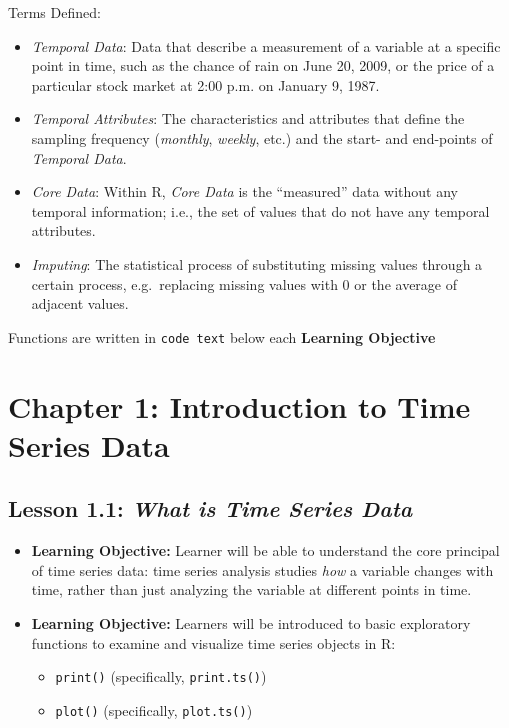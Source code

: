 \documentclass[
]{book}
\providecommand{\tightlist}{%
  \setlength{\itemsep}{0pt}\setlength{\parskip}{0pt}}
\begin{document}
Terms Defined:

\begin{itemize}
\tightlist
\item
  \emph{Temporal Data}: Data that describe a measurement of a variable at a specific point in time, such as the chance of rain on June 20, 2009, or the price of a particular stock market at 2:00 p.m. on January 9, 1987.
\item
  \emph{Temporal Attributes}: The characteristics and attributes that define the sampling frequency (\emph{monthly}, \emph{weekly}, etc.) and the start- and end-points of \emph{Temporal Data}.
\item
  \emph{Core Data}: Within R, \emph{Core Data} is the ``measured'' data without any temporal information; i.e., the set of values that do not have any temporal attributes.
\item
  \emph{Imputing}: The statistical process of substituting missing values through a certain process, e.g.~replacing missing values with 0 or the average of adjacent values.
\end{itemize}

Functions are written in \texttt{code\ text} below each \textbf{Learning Objective}

\hypertarget{chapter-1-introduction-to-time-series-data}{%
\section*{Chapter 1: Introduction to Time Series Data}\label{chapter-1-introduction-to-time-series-data}}

\hypertarget{lesson-1.1-what-is-time-series-data}{%
\subsection*{\texorpdfstring{Lesson 1.1: \emph{What is Time Series Data}}{Lesson 1.1: What is Time Series Data}}\label{lesson-1.1-what-is-time-series-data}}

\begin{itemize}
\tightlist
\item
  \textbf{Learning Objective:} Learner will be able to understand the core principal of time series data: time series analysis studies \emph{how} a variable changes with time, rather than just analyzing the variable at different points in time.
\item
  \textbf{Learning Objective:} Learners will be introduced to basic exploratory functions to examine and visualize time series objects in R:

  \begin{itemize}
  \tightlist
  \item
    \texttt{print()} (specifically, \texttt{print.ts()})
  \item
    \texttt{plot()} (specifically, \texttt{plot.ts()})
  \end{itemize}
\end{itemize}
\end{document}
